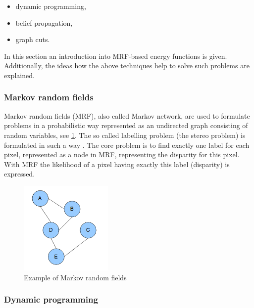 \begin{itemize}
  \item dynamic programming,
  \item belief propagation,
  \item graph cuts.
\end{itemize}

\noindent In this section an introduction into MRF-based energy functions is given.
Additionally, the ideas how the above techniques help to solve such problems are explained.

\subsubsection{Markov random fields}

Markov random fields (MRF), also called Markov network, are used to formulate problems in a probabilistic way represented as an undirected graph consisting of random variables, see \ref{fig:markov}.
The so called labelling problem (the stereo problem) is formulated in such a way \citep{tamassia2013handbook}.
The core problem is to find exactly one label for each pixel, represented as a node in MRF, representing the disparity for this pixel.
With MRF the likelihood of a pixel having exactly this label (disparity) is expressed.

\begin{figure}[h!]
  \centering
  \includegraphics[width=0.4\textwidth]{src/images/mrf-example.png}
  \caption[Example of Markov random fields]{Example of Markov random fields\protect\footnotemark}
  \label{fig:markov}
\end{figure}

\subsubsection{Dynamic programming}

